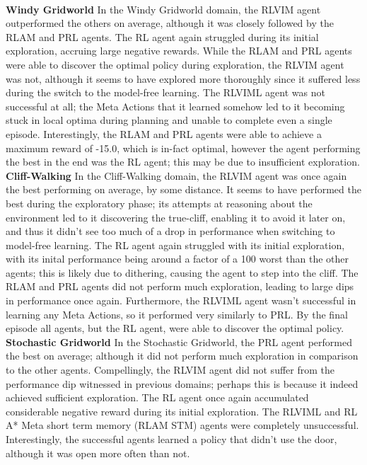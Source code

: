 \\\textbf{Windy Gridworld} \quad In the Windy Gridworld domain, the RLVIM agent outperformed the others on average, although it was closely followed by the RLAM and PRL agents. The RL agent again struggled during its initial exploration, accruing large negative rewards. While the RLAM and PRL agents were able to discover the optimal policy during exploration, the RLVIM agent was not, although it seems to have explored more thoroughly since it suffered less during the switch to the model-free learning. The RLVIML agent was not successful at all; the Meta Actions that it learned somehow led to it becoming stuck in local optima during planning and unable to complete even a single episode. Interestingly, the RLAM and PRL agents were able to achieve a maximum reward of -15.0, which is in-fact optimal, however the agent performing the best in the end was the RL agent; this may be due to insufficient exploration.
\\\textbf{Cliff-Walking} \quad In the Cliff-Walking domain, the RLVIM agent was once again the best performing on average, by some distance. It seems to have performed the best during the exploratory phase; its attempts at reasoning about the environment led to it discovering the true-cliff, enabling it to avoid it later on, and thus it didn't see too much of a drop in performance when switching to model-free learning. The RL agent again struggled with its initial exploration, with its inital performance being around a factor of a 100 worst than the other agents; this is likely due to dithering, causing the agent to step into the cliff. The RLAM and PRL agents did not perform much exploration, leading to large dips in performance once again. Furthermore, the RLVIML agent wasn't successful in learning any Meta Actions, so it performed very similarly to PRL. By the final episode all agents, but the RL agent, were able to discover the optimal policy.
\\\textbf{Stochastic Gridworld}  \quad In the Stochastic Gridworld, the PRL agent performed the best on average; although it did not perform much exploration in comparison to the other agents. Compellingly, the RLVIM agent did not suffer from the performance dip witnessed in previous domains; perhaps this is because it indeed achieved sufficient exploration. The RL agent once again accumulated considerable negative reward during its initial exploration. The RLVIML and RL A* Meta short term memory (RLAM STM) agents were completely unsuccessful. Interestingly, the successful agents learned a policy that didn't use the door, although it was open more often than not.
